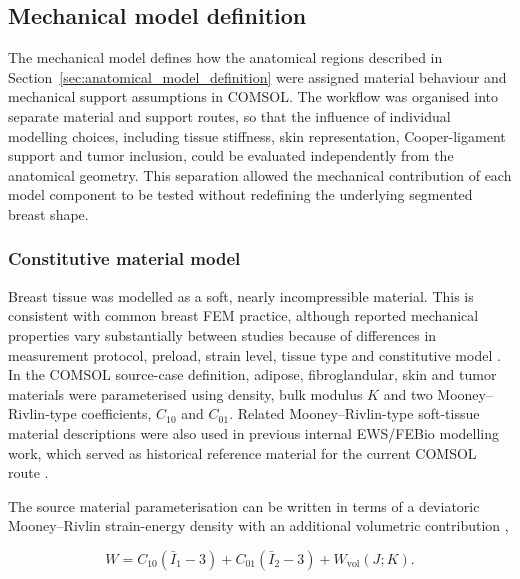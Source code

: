

\subsection{Mechanical model definition}
\label{sec:mechanical_model_definition}

The mechanical model defines how the anatomical regions described in Section~\ref{sec:anatomical_model_definition} were assigned material behaviour and mechanical support assumptions in COMSOL. The workflow was organised into separate material and support routes, so that the influence of individual modelling choices, including tissue stiffness, skin representation, Cooper-ligament support and tumor inclusion, could be evaluated independently from the anatomical geometry. This separation allowed the mechanical contribution of each model component to be tested without redefining the underlying segmented breast shape.

\subsubsection{Constitutive material model}
\label{constitutive_material_model}

Breast tissue was modelled as a soft, nearly incompressible material. This is consistent with common breast FEM practice, although reported mechanical properties vary substantially between studies because of differences in measurement protocol, preload, strain level, tissue type and constitutive model \cite{Samani2007,Ramiao2016,Goodbrake2022,Teixeira2023}. In the COMSOL source-case definition, adipose, fibroglandular, skin and tumor materials were parameterised using density, bulk modulus $K$ and two Mooney--Rivlin-type coefficients, $C_{10}$ and $C_{01}$. Related Mooney--Rivlin-type soft-tissue material descriptions were also used in previous internal EWS/FEBio modelling work, which served as historical reference material for the current COMSOL route \cite{EngelsEWSReport,StormEWSReport}.

The source material parameterisation can be written in terms of a deviatoric Mooney--Rivlin strain-energy density with an additional volumetric contribution \cite{Mooney1940,Rivlin1948},

\begin{equation}
W
=
C_{10}\left(\bar{I}_{1}-3\right)
+
C_{01}\left(\bar{I}_{2}-3\right)
+
W_{\mathrm{vol}}\left(J;K\right).
\label{mooney_rivlin_strain_energy_density}
\end{equation}

